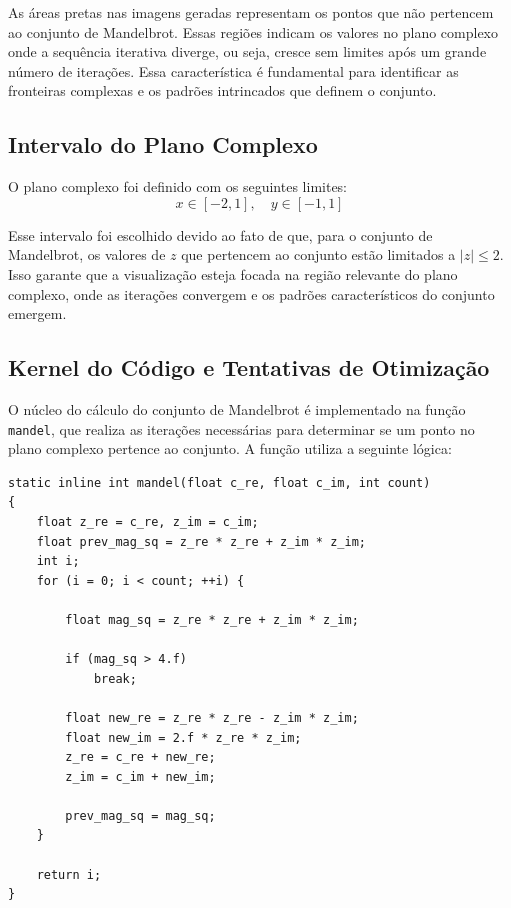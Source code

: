As áreas pretas nas imagens geradas representam os pontos que não pertencem ao conjunto de Mandelbrot. Essas regiões indicam os valores no plano complexo onde a sequência iterativa diverge, ou seja, cresce sem limites após um grande número de iterações. Essa característica é fundamental para identificar as fronteiras complexas e os padrões intrincados que definem o conjunto.

\subsection{Intervalo do Plano Complexo}

O plano complexo foi definido com os seguintes limites:
\[
x \in [-2, 1], \quad y \in [-1, 1]
\]

Esse intervalo foi escolhido devido ao fato de que, para o conjunto de Mandelbrot, os valores de \( z \) que pertencem ao conjunto estão limitados a \( |z| \leq 2 \). Isso garante que a visualização esteja focada na região relevante do plano complexo, onde as iterações convergem e os padrões característicos do conjunto emergem.


\subsection{Kernel do Código e Tentativas de Otimização}

O núcleo do cálculo do conjunto de Mandelbrot é implementado na função \texttt{mandel}\cite{intel-fractal-code}, que realiza as iterações necessárias para determinar se um ponto no plano complexo pertence ao conjunto. A função utiliza a seguinte lógica:

\begin{lstlisting}[caption=Kernel do cálculo do conjunto de Mandelbrot]
static inline int mandel(float c_re, float c_im, int count)
{
    float z_re = c_re, z_im = c_im;
    float prev_mag_sq = z_re * z_re + z_im * z_im;
    int i;
    for (i = 0; i < count; ++i) {

        float mag_sq = z_re * z_re + z_im * z_im;

        if (mag_sq > 4.f)
            break;

        float new_re = z_re * z_re - z_im * z_im;
        float new_im = 2.f * z_re * z_im;
        z_re = c_re + new_re;
        z_im = c_im + new_im;

        prev_mag_sq = mag_sq;
    }

    return i;
}
\end{lstlisting}

